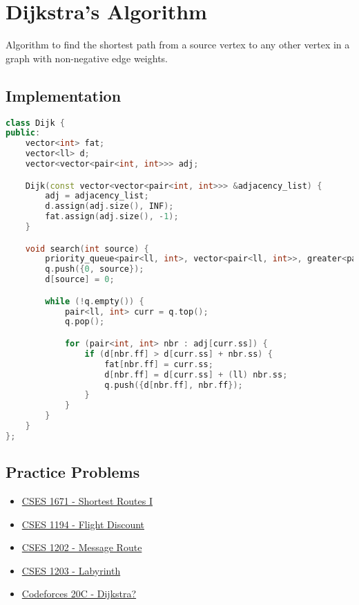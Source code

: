 \documentclass[12pt]{article}
\begin{document}
\section{Dijkstra's Algorithm}

Algorithm to find the shortest path from a source vertex to any other vertex in a graph with non-negative edge weights.

\subsection{Implementation}
\begin{lstlisting}[language=C++]
class Dijk {
public:
    vector<int> fat;
    vector<ll> d;
    vector<vector<pair<int, int>>> adj;

    Dijk(const vector<vector<pair<int, int>>> &adjacency_list) {
        adj = adjacency_list;
        d.assign(adj.size(), INF);
        fat.assign(adj.size(), -1);
    }

    void search(int source) {
        priority_queue<pair<ll, int>, vector<pair<ll, int>>, greater<pair<ll, int>>> q;
        q.push({0, source});
        d[source] = 0;

        while (!q.empty()) {
            pair<ll, int> curr = q.top();
            q.pop();

            for (pair<int, int> nbr : adj[curr.ss]) {
                if (d[nbr.ff] > d[curr.ss] + nbr.ss) {
                    fat[nbr.ff] = curr.ss;
                    d[nbr.ff] = d[curr.ss] + (ll) nbr.ss;
                    q.push({d[nbr.ff], nbr.ff});
                }
            }
        }
    }
};
\end{lstlisting}

\subsection{Practice Problems}
\begin{itemize}
    \item \href{https://cses.fi/problemset/task/1671}{CSES 1671 - Shortest Routes I}
    \item \href{https://cses.fi/problemset/task/1194}{CSES 1194 - Flight Discount}
    \item \href{https://cses.fi/problemset/task/1202}{CSES 1202 - Message Route}
    \item \href{https://cses.fi/problemset/task/1203}{CSES 1203 - Labyrinth}
    \item \href{https://codeforces.com/problemset/problem/20/C}{Codeforces 20C - Dijkstra?}
\end{itemize}
\end{document}
